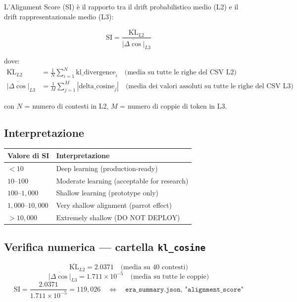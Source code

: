 \documentclass[12pt, a4paper]{article}
\begin{document}
L'Alignment Score (SI) è il rapporto tra il drift probabilistico medio (L2)
e il drift rappresentazionale medio (L3):

\begin{equation}
    \mathrm{SI} = \frac{\overline{\mathrm{KL}}_{L2}}{\overline{|\Delta\cos|}_{L3}}
    \label{eq:si}
\end{equation}

dove:
\begin{align}
    \overline{\mathrm{KL}}_{L2} &= \frac{1}{N}\sum_{i=1}^{N} \mathrm{kl\_divergence}_i
    \quad \text{(media su tutte le righe del CSV L2)} \label{eq:l2_mean}\\[6pt]
    \overline{|\Delta\cos|}_{L3} &= \frac{1}{M}\sum_{j=1}^{M} |\mathrm{delta\_cosine}_j|
    \quad \text{(media dei valori assoluti su tutte le righe del CSV L3)} \label{eq:l3_mean}
\end{align}

con $N$ = numero di contesti in L2, $M$ = numero di coppie di token in L3.

\subsection{Interpretazione}

\begin{center}
\begin{tabular}{ll}
\toprule
Valore di SI & Interpretazione \\
\midrule
$< 10$ & Deep learning (production-ready) \\
$10$--$100$ & Moderate learning (acceptable for research) \\
$100$--$1{,}000$ & Shallow learning (prototype only) \\
$1{,}000$--$10{,}000$ & Very shallow alignment (parrot effect) \\
$> 10{,}000$ & Extremely shallow (DO NOT DEPLOY) \\
\bottomrule
\end{tabular}
\end{center}

\subsection{Verifica numerica — cartella \texttt{kl\_cosine}}

\[
\overline{\mathrm{KL}}_{L2} = 2.0371 \quad \text{(media su 40 contesti)}
\]
\[
\overline{|\Delta\cos|}_{L3} = 1.711 \times 10^{-5} \quad \text{(media su tutte le coppie)}
\]
\[
\mathrm{SI} = \frac{2.0371}{1.711 \times 10^{-5}} = 119{,}026 \quad \Longleftrightarrow \quad
\texttt{era\_summary.json},\ \texttt{"alignment\_score"}
\]
\end{document}
